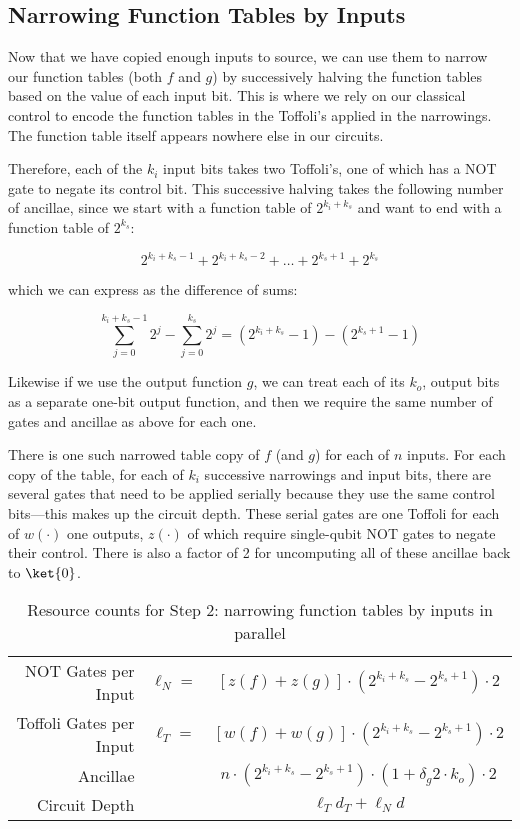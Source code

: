 \subsection{Narrowing Function Tables by Inputs}
\label{subsec:narrow}

Now that we have copied enough inputs to source, we can use them
to narrow our function tables (both $f$ and $g$) by successively
halving the function tables based on the value of each
input bit. This is where we rely on our classical control to encode
the function tables in the Toffoli's applied in the narrowings. The function
table itself appears nowhere else in our circuits.

Therefore, each of the $k_i$ input bits takes two Toffoli's,
one of which has a NOT gate to negate its control bit. This
successive halving takes the following number of ancillae, since we start
with a function table of $2^{k_i + k_s}$ and want to end with a function
table of $2^{k_s}$:

\begin{displaymath}
2^{k_i + k_s - 1} + 2^{k_i + k_s - 2} + \ldots + 2^{k_s + 1} + 2^{k_s}
\end{displaymath}

which we can express as the difference of sums:

\begin{displaymath}
\sum_{j=0}^{k_i + k_s - 1} 2^j - \sum_{j=0}^{k_s} 2^j = 
\left( 2^{k_i+k_s} - 1 \right) - \left( 2^{k_s+1} - 1 \right)
\end{displaymath}

Likewise if we use the output function $g$, we can treat each of its
$k_o$, output bits as a separate one-bit output function, and then we
require the same number of gates and ancillae as above for each one.

There is one such narrowed table copy of $f$ (and $g$) for each of $n$ inputs.
For each copy of the table, for each of $k_i$ successive narrowings and
input bits, there are several gates that need to be applied serially because
they use the same control bits---this makes up the circuit depth.
These serial gates are one Toffoli for each of $w(\cdot)$ one outputs,
$z(\cdot)$ of which require single-qubit NOT gates to negate their control.
There is also a factor
of 2 for uncomputing all of these ancillae back to $\ket{0}$.

\begin{table}
\begin{center}
\begin{tabular}{|r|cc|}
\hline
NOT Gates per Input & $\ell_N = $ & $[z(f)+z(g)] \cdot (2^{k_i+k_s} - 2^{k_s+1}) \cdot 2$ \\
Toffoli Gates per Input & $\ell_T = $ & $[w(f)+w(g)] \cdot (2^{k_i+k_s} - 2^{k_s+1}) \cdot 2$\\
Ancillae & & $n\cdot (2^{k_i+k_s} - 2^{k_s+1}) \cdot (1 + \delta_g2\cdot k_o) \cdot 2$\\
Circuit Depth & & $\ell_T d_T + \ell_N d$\\
\hline
\end{tabular}
\caption{Resource counts for Step 2: narrowing function tables by inputs in parallel}
\end{center}
\end{table}